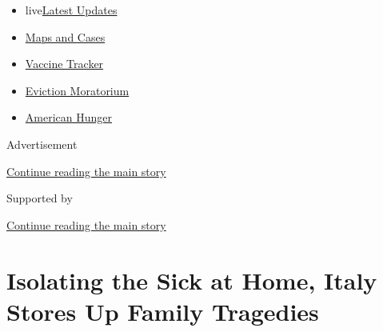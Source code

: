 \begin{itemize}
\tightlist
\item
  live\href{https://www.nytimes3xbfgragh.onion/2020/09/05/world/coronavirus-covid.html?name=styln-coronavirus-national\&region=TOP_BANNER\&block=storyline_menu_recirc\&action=click\&pgtype=Article\&impression_id=f59e76e0-efba-11ea-943d-2f0afe93ad3a\&variant=undefined}{Latest
  Updates}
\item
  \href{https://www.nytimes3xbfgragh.onion/interactive/2020/us/coronavirus-us-cases.html?name=styln-coronavirus-national\&region=TOP_BANNER\&block=storyline_menu_recirc\&action=click\&pgtype=Article\&impression_id=f59e76e1-efba-11ea-943d-2f0afe93ad3a\&variant=undefined}{Maps
  and Cases}
\item
  \href{https://www.nytimes3xbfgragh.onion/interactive/2020/science/coronavirus-vaccine-tracker.html?name=styln-coronavirus-national\&region=TOP_BANNER\&block=storyline_menu_recirc\&action=click\&pgtype=Article\&impression_id=f59e76e2-efba-11ea-943d-2f0afe93ad3a\&variant=undefined}{Vaccine
  Tracker}
\item
  \href{https://www.nytimes3xbfgragh.onion/2020/09/02/your-money/eviction-moratorium-covid.html?name=styln-coronavirus-national\&region=TOP_BANNER\&block=storyline_menu_recirc\&action=click\&pgtype=Article\&impression_id=f59e76e3-efba-11ea-943d-2f0afe93ad3a\&variant=undefined}{Eviction
  Moratorium}
\item
  \href{https://www.nytimes3xbfgragh.onion/interactive/2020/09/02/magazine/food-insecurity-hunger-us.html?name=styln-coronavirus-national\&region=TOP_BANNER\&block=storyline_menu_recirc\&action=click\&pgtype=Article\&impression_id=f59e76e4-efba-11ea-943d-2f0afe93ad3a\&variant=undefined}{American
  Hunger}
\end{itemize}

Advertisement

\protect\hyperlink{after-top}{Continue reading the main story}

Supported by

\protect\hyperlink{after-sponsor}{Continue reading the main story}

\hypertarget{isolating-the-sick-at-home-italy-stores-up-family-tragedies}{%
\section{Isolating the Sick at Home, Italy Stores Up Family
Tragedies}\label{isolating-the-sick-at-home-italy-stores-up-family-tragedies}}

